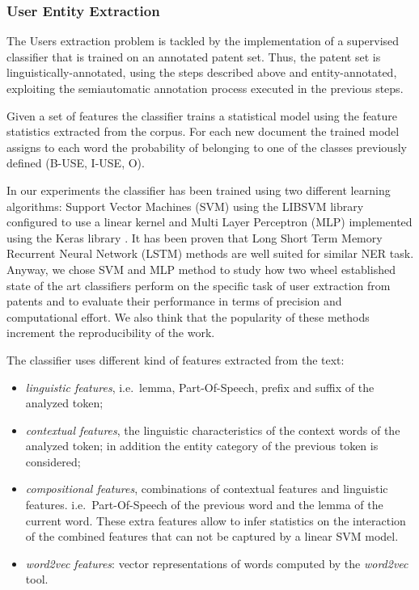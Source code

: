 \documentclass[b5paper,]{book}
\theoremstyle{definition}
\theoremstyle{definition}
\theoremstyle{definition}
\theoremstyle{remark}
\begin{document}
\subsubsection*{User Entity Extraction}\label{user-entity-extraction}

The Users extraction problem is tackled by the implementation of a
supervised classifier that is trained on an annotated patent set. Thus,
the patent set is linguistically-annotated, using the steps described
above and entity-annotated, exploiting the semiautomatic annotation
process executed in the previous steps.

Given a set of features the classifier trains a statistical model using
the feature statistics extracted from the corpus. For each new document
the trained model assigns to each word the probability of belonging to
one of the classes previously defined (B-USE, I-USE, O).

In our experiments the classifier has been trained using two different
learning algorithms: Support Vector Machines (SVM) using the LIBSVM
library \citep{svm} configured to use a linear kernel and Multi Layer
Perceptron (MLP) implemented using the Keras library \citep{libkeras}.
It has been proven that Long Short Term Memory Recurrent Neural Network
(LSTM) \citep{chiu2016named} methods are well suited for similar NER
task. Anyway, we chose SVM and MLP method to study how two wheel
established state of the art classifiers perform on the specific task of
user extraction from patents and to evaluate their performance in terms
of precision and computational effort. We also think that the popularity
of these methods increment the reproducibility of the work.

The classifier uses different kind of features extracted from the text:

\begin{itemize}
\item
  \emph{linguistic features}, i.e.~lemma, Part-Of-Speech, prefix and
  suffix of the analyzed token;
\item
  \emph{contextual features}, the linguistic characteristics of the
  context words of the analyzed token; in addition the entity category
  of the previous token is considered;
\item
  \emph{compositional features}, combinations of contextual features and
  linguistic features. i.e.~Part-Of-Speech of the previous word and the
  lemma of the current word. These extra features allow to infer
  statistics on the interaction of the combined features that can not be
  captured by a linear SVM model.
\item
  \emph{word2vec features}: vector representations of words computed by
  the \emph{word2vec} \citep{word2vec1} tool.
\end{itemize}
\end{document}
